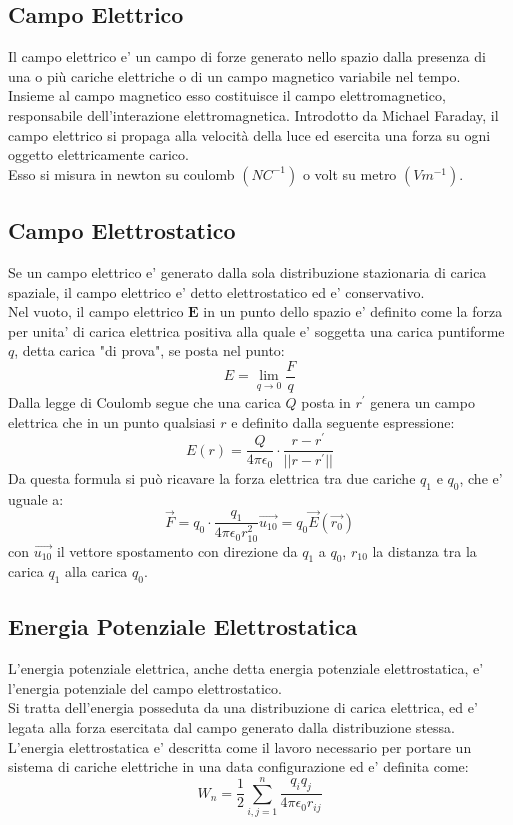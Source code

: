 \documentclass[a4paper, 10pt]{article}
\begin{document}
		\subsection{Campo Elettrico}
			Il campo elettrico e' un campo di forze generato nello spazio dalla presenza di una o più cariche elettriche o 
			di un campo magnetico variabile nel tempo. \\
			Insieme al campo magnetico esso costituisce il campo elettromagnetico, 
			responsabile dell'interazione elettromagnetica. Introdotto da Michael Faraday, il campo elettrico si propaga 
			alla velocità della luce ed esercita una forza su ogni oggetto elettricamente carico. \\
			Esso si misura in newton su coulomb $(N C^{-1})$ o volt su metro $(V m^{-1})$.
		\subsection{Campo Elettrostatico}
			Se un campo elettrico e' generato dalla sola distribuzione stazionaria di carica spaziale, il campo elettrico 
			e' detto elettrostatico ed e' conservativo. \\
			Nel vuoto, il campo elettrico $\textbf{E}$ in un punto dello spazio e' definito come la forza per unita' 
			di carica elettrica positiva alla quale e' soggetta una carica puntiforme $q$, detta carica "di prova", 
			se posta nel punto:
			\[ E = \lim_{q \to 0} \frac{F}{q} \]
			Dalla legge di Coulomb segue che una carica $Q$ posta in $r^{'}$ genera un 
			campo elettrica che in un punto qualsiasi $r$ e definito dalla seguente espressione:
			\[ E(r) = \frac{Q}{4 \pi \epsilon_0} \cdot \frac{r - r^{'}}{\vert \vert r - r^{'} \vert \vert} \]
			Da questa formula si può ricavare la forza elettrica tra due cariche $q_1$ e $q_0$, che e' uguale a:
			\[ \overrightarrow{F} = q_0 \cdot \frac{q_1}{4 \pi \epsilon_0 r^2_{10}} \overrightarrow{u_{10}}
			= q_0 \overrightarrow{E}(\overrightarrow{r_0}) \]
			con $\overrightarrow{u_{10}}$ il vettore spostamento con direzione da $q_1$ a $q_0$, 
			$r_{10}$ la distanza tra la carica $q_1$ alla carica $q_0$.
		\subsection{Energia Potenziale Elettrostatica}
			L'energia potenziale elettrica, anche detta energia potenziale elettrostatica, e' l'energia potenziale del campo
	    		elettrostatico. \\
	    		Si tratta dell'energia posseduta da una distribuzione di carica elettrica, ed e' legata alla 
	    		forza esercitata dal campo generato dalla distribuzione stessa. \\
	    		L'energia elettrostatica e' descritta come il lavoro necessario per portare un sistema di cariche elettriche in
	    		una data configurazione ed e' definita come:
	    		\[ W_n = \frac{1}{2} \sum_{i,j=1}^n \frac{q_i q_j}{4 \pi \epsilon_0 r_{ij}} \]
	    		\newpage
\end{document}
